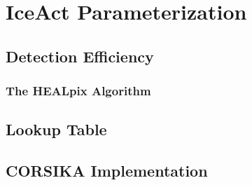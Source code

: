 \chapter{IceAct Parameterization}

\section{Detection Efficiency}

\subsection{The HEALpix Algorithm}

\section{Lookup Table}

\section{CORSIKA Implementation}
